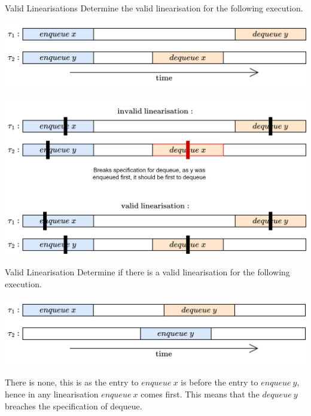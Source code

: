 \begin{examplebox}{Valid Linearisations}
    Determine the valid linearisation for the following execution.
    \begin{center}
        \includegraphics[width=.9\textwidth]{concurrent_objects/images/example_valid_linearisation.drawio.png}
    \end{center}
    \tcblower
    \begin{center}
        \includegraphics[width=.9\textwidth]{concurrent_objects/images/example_valid_linearisation_answer.drawio.png}
    \end{center}
\end{examplebox}

\begin{examplebox}{Valid Linearisation}
    Determine if there is a valid linearisation for the following execution.
    \begin{center}
        \includegraphics[width=.9\textwidth]{concurrent_objects/images/example_invalid_linearisation.drawio.png}
    \end{center}
    \tcblower
    There is none, this is as the entry to $enqueue \ x$ is before the entry to $enqueue \ y$, hence in any linearisation $enqueue \ x$ comes first. This means that the $dequeue \ y$ breaches the specification of dequeue.
\end{examplebox}


